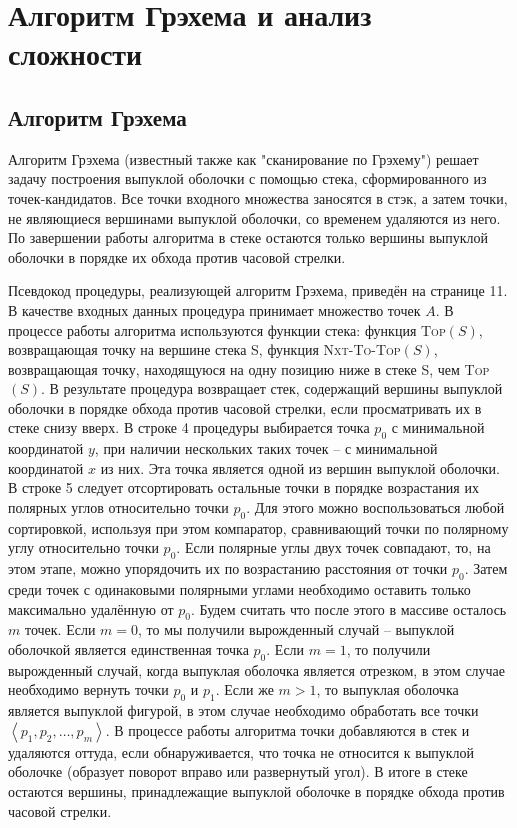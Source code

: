 \section{Алгоритм Грэхема и анализ сложности}

\subsection{Алгоритм Грэхема}

Алгоритм Грэхема (известный также как "сканирование по Грэхему")\footnotemark{} решает задачу построения выпуклой оболочки с помощью стека, сформированного из точек-кандидатов. Все точки входного множества заносятся в стэк, а затем точки, не являющиеся вершинами выпуклой оболочки, со временем удаляются из него. По завершении работы алгоритма в стеке остаются только вершины выпуклой оболочки в порядке их обхода против часовой стрелки.


Псевдокод процедуры, реализующей алгоритм Грэхема, приведён на странице 11. В качестве входных данных процедура принимает множество точек $A$. В процессе работы алгоритма используются функции стека: функция \textsc{Top}$(S)$, возвращающая точку на вершине стека S, функция \textsc{Nxt-To-Top}$(S)$, возвращающая точку, находящуюся на одну позицию ниже в стеке S, чем \textsc{Top}$(S)$. В результате процедура возвращает стек, содержащий вершины выпуклой оболочки в порядке обхода против часовой стрелки, если просматривать их в стеке снизу вверх.
В строке 4 процедуры выбирается точка $p_0$ с минимальной координатой $y$, при наличии нескольких таких точек -- с минимальной координатой $x$ из них. Эта точка является одной из вершин выпуклой оболочки. В строке 5 следует отсортировать остальные точки в порядке возрастания их полярных углов относительно точки $p_0$. Для этого можно воспользоваться любой сортировкой, используя при этом компаратор, сравнивающий точки по полярному углу относительно точки $p_0$. Если полярные углы двух точек совпадают, то, на этом этапе, можно упорядочить их по возрастанию расстояния от точки $p_0$. Затем среди точек с одинаковыми полярными углами необходимо оставить только максимально удалённую от $p_0$. Будем считать что после этого в массиве осталось $m$ точек. Если $m = 0$, то мы получили вырожденный случай -- выпуклой оболочкой является единственная точка $p_0$. Если $m = 1$, то получили вырожденный случай, когда выпуклая оболочка является отрезком, в этом случае необходимо вернуть точки $p_0$ и $p_1$. Если же $m > 1$, то выпуклая оболочка является выпуклой фигурой, в этом случае необходимо обработать все точки $\left\langle p_1, p_2, \dots, p_m\right\rangle $. В процессе работы алгоритма точки добавляются в стек и удаляются оттуда, если обнаруживается, что точка не относится к выпуклой оболочке (образует поворот вправо или развернутый угол). В итоге в стеке остаются вершины, принадлежащие выпуклой оболочке в порядке обхода против часовой стрелки.

